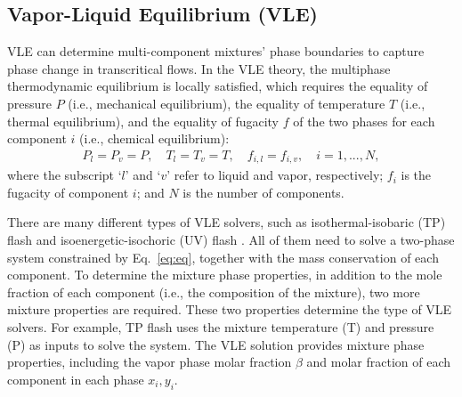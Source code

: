 \subsection{Vapor-Liquid Equilibrium (VLE)}
VLE can determine multi-component mixtures' phase boundaries to capture phase change in transcritical flows. In the VLE theory, the multiphase thermodynamic equilibrium is locally satisfied, which requires the equality of pressure $P$ (i.e., mechanical equilibrium), the equality of temperature $T$ (i.e., thermal equilibrium), and the equality of fugacity $f$ of the two phases for each component $i$ (i.e., chemical equilibrium):
\begin{align}
P_l=P_v=P,\quad T_l=T_v=T,\quad f_{i,l}=f_{i,v},\quad i=1,...,N, \label{eq:eq}
\end{align}
where the subscript `$l$' and `$v$' refer to liquid and vapor, respectively; $f_i$ is the fugacity of component $i$; and $N$ is the number of components.

There are many different types of VLE solvers, such as isothermal-isobaric (TP) flash \cite{michelsen1982isothermal} and isoenergetic-isochoric (UV) flash \cite{saha1997isoenergetic}. All of them need to solve a two-phase system constrained by Eq.~\ref{eq:eq}, together with the mass conservation of each component. To determine the mixture phase properties, in addition to the mole fraction of each component (i.e., the composition of the mixture), two more mixture properties are required. These two properties determine the type of VLE solvers. For example, TP flash uses the mixture temperature (T) and pressure (P) as inputs to solve the system. The VLE solution provides mixture phase properties, including the vapor phase molar fraction $\beta$ and molar fraction of each component in each phase $x_i,y_i$. 

